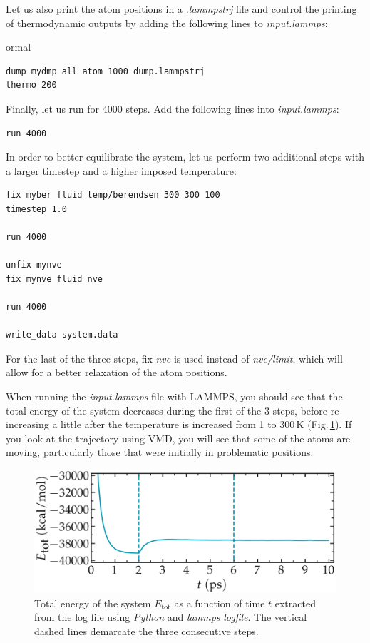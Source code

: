 \documentclass[9pt,tutorial]{livecoms}
\begin{document}
Let us also print the atom positions in a \textit{.lammpstrj} file and control the printing of thermodynamic outputs by adding the following lines to \textit{input.lammps}:
{
ormal \begin{verbatim}
dump mydmp all atom 1000 dump.lammpstrj
thermo 200
\end{verbatim}}
Finally, let us run for 4000 steps. Add the following lines into \textit{input.lammps}:
{\normalsize \begin{verbatim}
run 4000
\end{verbatim}}
In order to better equilibrate the system, let us perform two additional steps with a larger timestep and a higher imposed temperature:
{\normalsize \begin{verbatim}
fix myber fluid temp/berendsen 300 300 100
timestep 1.0

run 4000

unfix mynve
fix mynve fluid nve

run 4000

write_data system.data
\end{verbatim}}
For the last of the three steps, fix \textit{nve} is used instead of \textit{nve/limit}, which will allow for a better relaxation of the atom positions. 

When running the \textit{input.lammps} file with LAMMPS, you should see that the total energy of the system decreases during the first of the 3 steps, before re-increasing a little after the temperature is increased from 1 to $300\,\text{K}$ (Fig.\,\ref{fig:NANOSHEAR-minimization}). If you look at the trajectory using VMD, you will see that some of the atoms are moving, particularly those that were initially in problematic positions. 

\begin{figure}
\centering
\includegraphics[width=\linewidth]{NANOSHEAR-minimization}
\caption{Total energy of the system $E_\text{tot}$ as a function of time $t$ extracted from the log file using \textit{Python} and \textit{lammps$\_$logfile}. The vertical dashed lines demarcate the three consecutive steps.}
\label{fig:NANOSHEAR-minimization}
\end{figure}
\end{document}
